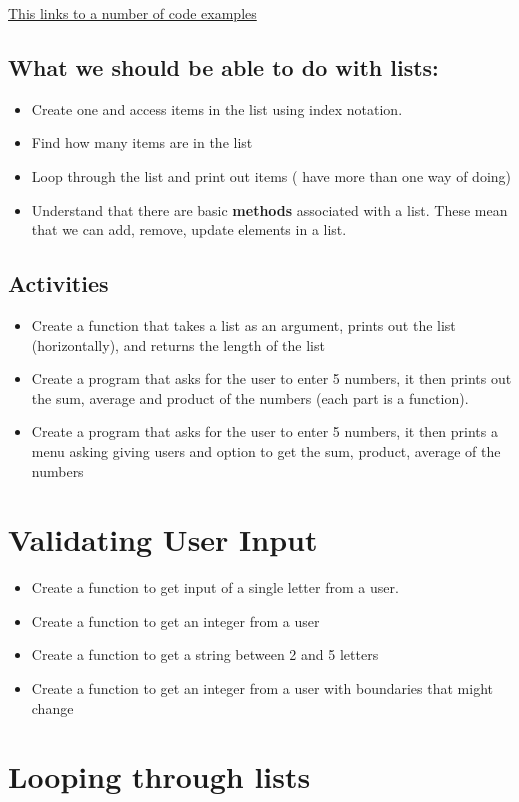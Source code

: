 \documentclass[a4paper,12pt]{article}
\begin{document}
\hyperlink{Lists}{This links to a number of code examples}
\subsection{What we should be able to do with lists:}
\begin{itemize}
	\item Create one and access items in the list using index notation.
	\item Find how many items are in the list
	\item Loop through the list and print out items ( have more than one way of doing)
	\item Understand that there are basic \textbf{methods} associated with a list. These mean that we can add, remove, update elements in a list.
\end{itemize}
\subsection{Activities}
\begin{itemize}
	\item Create a function that takes a list as an argument, prints out the list (horizontally), and returns the length of the list
	\item Create a program that asks for the user to enter 5 numbers, it then prints out the sum, average  and product of the numbers (each part is a function).
	\item Create a program that asks for the user to enter 5 numbers, it then prints a menu asking giving users and option to get the sum, product, average of the numbers
\end{itemize}
\section{Validating User Input}
\begin{itemize}
\item Create a function to get input of a single letter from a user.
\item  Create a function to get an integer from a user
\item Create a function to get a string between 2 and 5 letters
\item Create a function to get an integer from a user with boundaries that might change
\end{itemize}
\section{Looping through lists}
\newpage
	\hypertarget{Lists}{}




\end{document}
